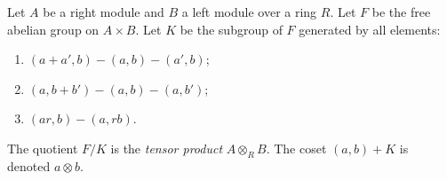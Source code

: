 Let $A$ be a right module and $B$ a left module over a ring $R$. Let $F$ be the free abelian group on $A \times B$. Let $K$ be the subgroup of $F$ generated by all elements:
\begin{enumerate}
\item[(i)] $(a + a',b) - (a,b) - (a',b)$;
\item[(ii)] $(a,b + b') - (a,b) - (a,b')$;
\item[(iii)] $(ar,b) - (a,rb)$.
\end{enumerate}
The quotient $F/K$ is the \emph{tensor product} $A \otimes_R B$. The coset $(a,b) + K$ is denoted $a \otimes b$.
